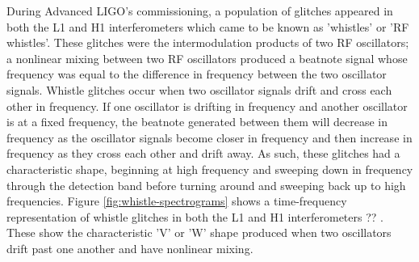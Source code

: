 During Advanced LIGO's commissioning,
a population of glitches appeared in both the L1 and H1 interferometers which 
came to be known as 'whistles' or 'RF whistles'. These glitches were the 
intermodulation products of two RF oscillators; a nonlinear mixing between two 
RF oscillators produced a beatnote signal whose frequency was equal to the 
difference in frequency between the two oscillator signals. Whistle glitches 
occur when two oscillator signals drift and cross each other in frequency. 
If one oscillator 
is drifting in frequency and another oscillator is at a fixed frequency, 
the beatnote generated between them will decrease in frequency as the 
oscillator signals become closer in frequency and then increase in frequency 
as they cross each other and drift away. 
As such, these glitches 
had a characteristic shape, beginning at high frequency and sweeping down 
in frequency through the detection band before turning around and 
sweeping back up to high frequencies. Figure \ref{fig:whistle-spectrograms} 
shows a time-frequency representation of whistle glitches in both the L1 and H1 
interferometers ?? . These show the characteristic 'V' or 'W' shape produced 
when two oscillators drift past one another and have nonlinear mixing.

